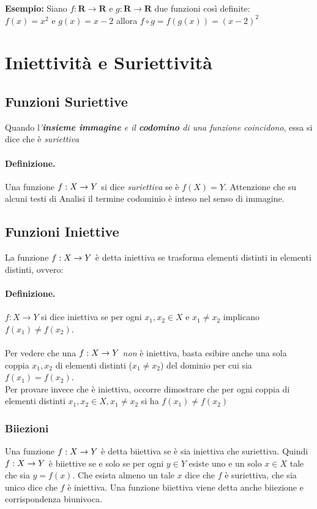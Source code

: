 \documentclass[12pt, a4paper, openany]{book}
\newcommand{\esempio}[1]{\begin{box_esempio} \textbf{Esempio: }#1\end{box_esempio}}
\begin{document}
\esempio{
    Siano $f: \mathbf{R} \rightarrow \mathbf{R}$ e $g: \mathbf{R} \rightarrow \mathbf{R}$ due funzioni così definite:
    \\ $f(x) = x^2$ e $g(x) = x - 2$ allora $f \circ g = f(g(x)) = (x-2)^2$    
}
\section{Iniettività e Suriettività}

\subsection*{Funzioni Suriettive}
Quando l\emph{'\textbf{insieme immagine} e il \textbf{codomino} di una funzione coincidono}, essa si dice che è \emph{suriettiva}
\paragraph{Definizione. } Una funzione $f: X \rightarrow Y$ si dice \emph{suriettiva} se è $f(X) = Y$.
Attenzione che su alcuni testi di Analisi il termine codominio è inteso nel senso di immagine.

\subsection*{Funzioni Iniettive}
La funzione $f: X \rightarrow Y$ è detta iniettiva se trasforma elementi distinti in elementi distinti, ovvero:
\paragraph{Definizione. } $f: X \rightarrow Y$ si dice iniettiva se per ogni $x_1, x_2 \in X$ e $x_1 \neq x_2$ implicano $f(x_1) \neq f(x_2)$.
\paragraph{}Per vedere che una $f: X \rightarrow Y$ \emph{non} è iniettiva, basta esibire anche una sola coppia $x_1, x_2$ di elementi distinti ($x_1 \neq x_2$) del dominio per cui sia $f(x_1) = f(x_2)$.
\\Per provare invece che è iniettiva, occorre dimostrare che per ogni coppia di elementi distinti $x_1, x_2 \in X, x_1 \neq x_2$ si ha $f(x_1) \neq f(x_2)$

\subsubsection{Biiezioni}
Una funzione $f: X \rightarrow Y$ è detta biiettiva se è sia iniettiva che suriettiva.
Quindi $f: X \rightarrow Y$ è biiettive se e solo se per ogni $y \in Y$ esiste uno e un solo $x \in X$ tale che sia $y = f(x)$.
Che esista almeno un tale $x$ dice che $f$ è suriettiva, che sia unico dice che $f$ è iniettiva.
Una funzione biiettiva viene detta anche biiezione e corrispondenza biunivoca. 
\end{document}
